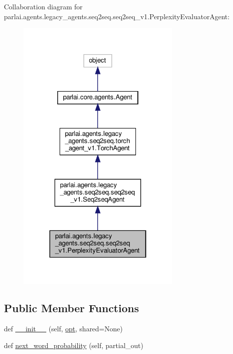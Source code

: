 Collaboration diagram for parlai.\+agents.\+legacy\+\_\+agents.\+seq2seq.\+seq2seq\+\_\+v1.\+Perplexity\+Evaluator\+Agent\+:
\nopagebreak
\begin{figure}[H]
\begin{center}
\leavevmode
\includegraphics[width=226pt]{d5/d37/classparlai_1_1agents_1_1legacy__agents_1_1seq2seq_1_1seq2seq__v1_1_1PerplexityEvaluatorAgent__coll__graph}
\end{center}
\end{figure}
\subsection*{Public Member Functions}
\begin{DoxyCompactItemize}
\item 
def \hyperlink{classparlai_1_1agents_1_1legacy__agents_1_1seq2seq_1_1seq2seq__v1_1_1PerplexityEvaluatorAgent_acf3daa1b1bfc893504efa07f3eb9b667}{\+\_\+\+\_\+init\+\_\+\+\_\+} (self, \hyperlink{classparlai_1_1agents_1_1legacy__agents_1_1seq2seq_1_1torch__agent__v1_1_1TorchAgent_a4e938a91873bd6edde0ac7ed5299bc6a}{opt}, shared=None)
\item 
def \hyperlink{classparlai_1_1agents_1_1legacy__agents_1_1seq2seq_1_1seq2seq__v1_1_1PerplexityEvaluatorAgent_a577da407eed3f8757efeab3522f2717b}{next\+\_\+word\+\_\+probability} (self, partial\+\_\+out)
\end{DoxyCompactItemize}
